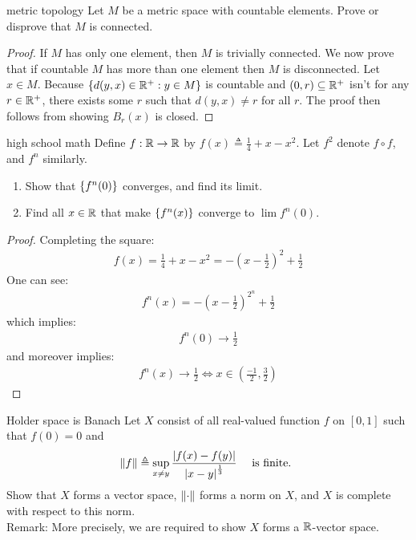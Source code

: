 \documentclass{report}
\begin{document}
\begin{question}{metric topology}{}
Let $M$ be a metric space with countable elements. Prove or disprove that $M$ is connected. 
\end{question}
\begin{proof}
If $M$ has only one element, then  $M$ is trivially connected. We now prove that if  countable $M$ has more than one element then  $M$ is disconnected. Let $x\in M$. Because $\left\{ d(y,x)\in\mathbb{R}^+: y \in M \right\}$ is countable and $(0,r)\subseteq \mathbb{R}^+$ isn't for any $r\in\mathbb{R}^+$,  there exists some  $r$ such that $d(y,x)\neq r$ for all $r$. The proof then follows from showing $B_r(x)$ is closed.  
\end{proof}
\begin{question}{high school math}{}
Define $f:\mathbb{R}\rightarrow \mathbb{R}$ by $f(x)\triangleq \frac{1}{4}+x-x^2$. Let $f^2$ denote  $f \circ f$, and $f^n$ similarly.  
\begin{enumerate}[label=(\roman*)]
  \item Show that $\left\{ f^n(0) \right\}$ converges, and find its limit. 
  \item Find all $x\in\mathbb{R}$ that make $\left\{ f^n(x) \right\}$ converge to $\lim f^n(0)$. 
\end{enumerate}
\end{question}
\begin{proof}
Completing the square: 
\begin{align*}
f(x) = \frac{1}{4}+ x-x^2= - (x-\frac{1}{2})^2+ \frac{1}{2} 
\end{align*}
One can see: 
\begin{align*}
  f^n(x)= - (x- \frac{1}{2})^{2^n}+ \frac{1}{2}
\end{align*}
which implies: 
\begin{align*}
f^n(0) \rightarrow \frac{1}{2} 
\end{align*}
and moreover implies: 
\begin{align*}
  f^n(x)\rightarrow \frac{1}{2}\iff  x \in \left(\frac{-1}{2},\frac{3}{2}\right)
\end{align*}
\end{proof}
\begin{question}{Holder space is Banach}{}
Let $X$ consist of all real-valued function $f$ on  $[0,1]$ such that $f(0)=0$ and 
 \begin{align*}
\left\| f \right\|\triangleq \sup_{x\neq y} \frac{\left|f(x)-f(y)\right|}{\left|x-y\right|^{\frac{1}{3}}} \quad \text{ is finite. }
\end{align*}
Show that $X$ forms a vector space,  $\left\| \cdot \right\|$ forms a norm on $X$, and  $X$ is complete with respect to this norm. \\

Remark: More precisely, we are required to show $X$ forms a $\mathbb{R}$-vector space.
\end{question}
\end{document}
